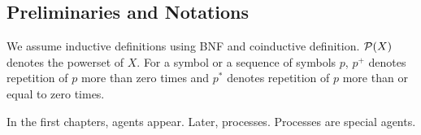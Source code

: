   \subsection{Preliminaries and Notations}

  We assume inductive definitions using BNF and coinductive definition.
  ${\mathcal P({X})}$ denotes the powerset of $X$.
  For a symbol or a sequence of symbols $p$,
  $p^+$ denotes repetition of $p$ more than zero times and
  $p^*$ denotes repetition of $p$ more than or equal to zero times.

  In the first chapters, agents appear.  Later, processes.  Processes
  are special agents.




